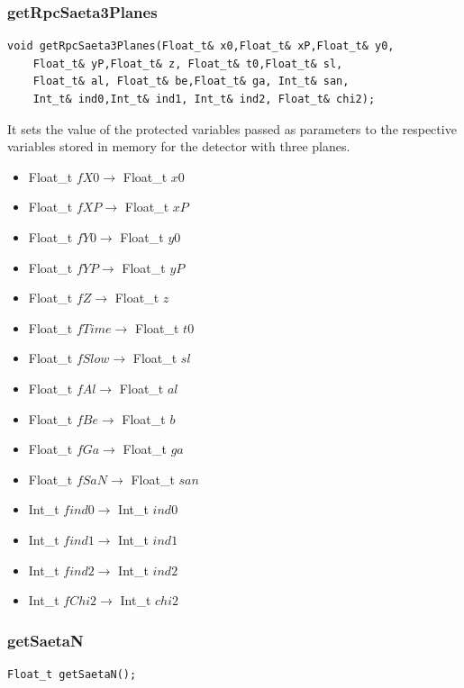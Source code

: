 \documentclass[a4paper]{book}
\begin{document}
\subsubsection{getRpcSaeta3Planes}

\begin{lstlisting}
void getRpcSaeta3Planes(Float_t& x0,Float_t& xP,Float_t& y0,
	Float_t& yP,Float_t& z, Float_t& t0,Float_t& sl,
	Float_t& al, Float_t& be,Float_t& ga, Int_t& san,
	Int_t& ind0,Int_t& ind1, Int_t& ind2, Float_t& chi2);
\end{lstlisting}

It sets the value of the protected variables passed as parameters to the respective variables stored in memory for the detector with three planes.

\begin{itemize}
	\item Float\_t $fX0 \rightarrow$ Float\_t $x0$
	\item Float\_t $fXP \rightarrow$ Float\_t $xP$
	\item Float\_t $fY0 \rightarrow$ Float\_t $y0$
	\item Float\_t $fYP \rightarrow$ Float\_t $yP$
	\item Float\_t $fZ \rightarrow$ Float\_t $z$
	\item Float\_t $fTime \rightarrow$ Float\_t $t0$
	\item Float\_t $fSlow \rightarrow$ Float\_t $sl$
	\item Float\_t $fAl \rightarrow$ Float\_t $al$
	\item Float\_t $fBe \rightarrow$ Float\_t $b$
	\item Float\_t $fGa \rightarrow$ Float\_t $ga$
	\item Float\_t $fSaN \rightarrow$ Float\_t $san$
	\item Int\_t $find0 \rightarrow$ Int\_t $ind0$
	\item Int\_t $find1 \rightarrow$ Int\_t $ind1$
	\item Int\_t $find2 \rightarrow$ Int\_t $ind2$
	\item Int\_t $fChi2 \rightarrow$ Int\_t $chi2$
\end{itemize}

\subsubsection{getSaetaN}

\begin{lstlisting}
Float_t getSaetaN();
\end{lstlisting}
\end{document}
